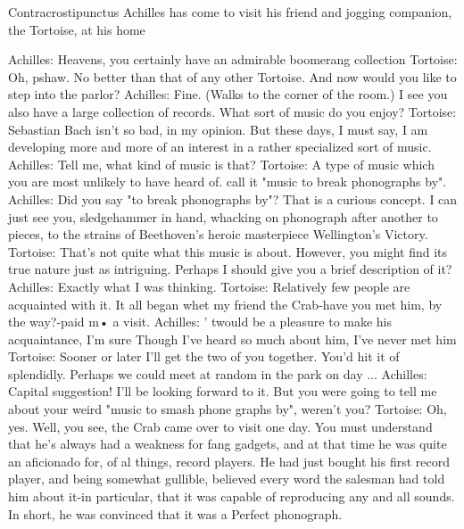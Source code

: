 
                               Contracrostipunctus
             Achilles has come to visit his friend and jogging companion, the
                                  Tortoise, at his home

Achilles: Heavens, you certainly have an admirable boomerang collection
Tortoise: Oh, pshaw. No better than that of any other Tortoise. And now would you like
       to step into the parlor?
Achilles: Fine. (Walks to the corner of the room.) I see you also have a large collection of
       records. What sort of music do you enjoy?
Tortoise: Sebastian Bach isn't so bad, in my opinion. But these days, I must say, I am
       developing more and more of an interest in a rather specialized sort of music.
Achilles: Tell me, what kind of music is that?
Tortoise: A type of music which you are most unlikely to have heard of. call it "music to
       break phonographs by".
Achilles: Did you say "to break phonographs by"? That is a curious concept. I can just
       see you, sledgehammer in hand, whacking on phonograph after another to pieces,
       to the strains of Beethoven's heroic masterpiece Wellington's Victory.
Tortoise: That's not quite what this music is about. However, you might find its true
       nature just as intriguing. Perhaps I should give you a brief description of it?
Achilles: Exactly what I was thinking.
Tortoise: Relatively few people are acquainted with it. It all began whet my friend the
       Crab-have you met him, by the way?-paid m• a visit.
Achilles: ' twould be a pleasure to make his acquaintance, I'm sure Though I've heard so
       much about him, I've never met him
Tortoise: Sooner or later I'll get the two of you together. You'd hit it of splendidly.
       Perhaps we could meet at random in the park on day ...
Achilles: Capital suggestion! I'll be looking forward to it. But you were going to tell me
       about your weird "music to smash phone graphs by", weren't you?
Tortoise: Oh, yes. Well, you see, the Crab came over to visit one day. You must
       understand that he's always had a weakness for fang gadgets, and at that time he
       was quite an aficionado for, of al things, record players. He had just bought his
       first record player, and being somewhat gullible, believed every word the
       salesman had told him about it-in particular, that it was capable of reproducing
       any and all sounds. In short, he was convinced that it was a Perfect phonograph.




